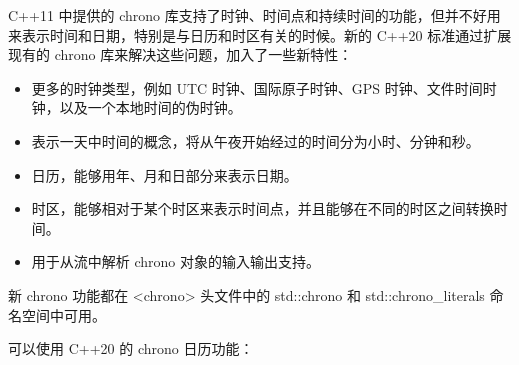 
C++11 中提供的 chrono 库支持了时钟、时间点和持续时间的功能，但并不好用来表示时间和日期，特别是与日历和时区有关的时候。新的 C++20 标准通过扩展现有的 chrono 库来解决这些问题，加入了一些新特性：

\begin{itemize}
\item
更多的时钟类型，例如 UTC 时钟、国际原子时钟、GPS 时钟、文件时间时钟，以及一个本地时间的伪时钟。

\item
表示一天中时间的概念，将从午夜开始经过的时间分为小时、分钟和秒。

\item
日历，能够用年、月和日部分来表示日期。

\item
时区，能够相对于某个时区来表示时间点，并且能够在不同的时区之间转换时间。

\item
用于从流中解析 chrono 对象的输入输出支持。
\end{itemize}


新 chrono 功能都在 <chrono> 头文件中的 std::chrono 和 std::chrono\_literals 命名空间中可用。


可以使用 C++20 的 chrono 日历功能：

